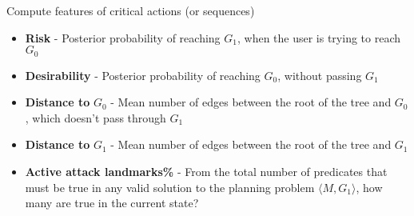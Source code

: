 \begin{frame}

Compute features of critical actions (or sequences)
\begin{itemize}
\item \textbf{Risk} - Posterior probability of reaching $G_1$, when the user is trying to reach $G_0$
\item \textbf{Desirability} - Posterior probability of reaching $G_0$, without passing $G_1$
\item \textbf{Distance to} $G_0$ - Mean number of edges between the root of the tree and $G_0$, which doesn't pass through $G_1$
\item \textbf{Distance to} $G_1$ - Mean number of edges between the root of the tree and $G_1$
\item \textbf{Active attack landmarks\%} - From the total number of predicates that must be true in any valid solution to the planning problem $\langle M,G_1\rangle$, how many are true in the current state?
\end{itemize}

\end{frame}
